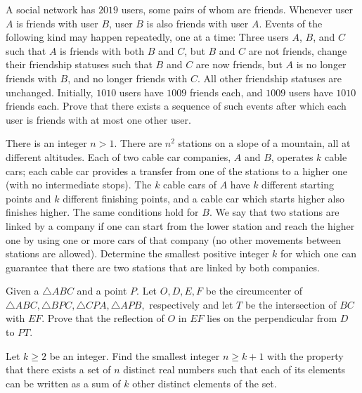 \documentclass[11pt]{scrartcl}
\begin{document}
\begin{problem}[8690567757444826166]
	A social network has $2019$ users, some pairs of whom are friends. Whenever user $A$ is friends with user $B$, user $B$ is also friends with user $A$. Events of the following kind may happen repeatedly, one at a time:
Three users $A$, $B$, and $C$ such that $A$ is friends with both $B$ and $C$, but $B$ and $C$ are not friends, change their friendship statuses such that $B$ and $C$ are now friends, but $A$ is no longer friends with $B$, and no longer friends with $C$. All other friendship statuses are unchanged.
Initially, $1010$ users have $1009$ friends each, and $1009$ users have $1010$ friends each. Prove that there exists a sequence of such events after which each user is friends with at most one other user.

\end{problem}
\begin{problem}[695330092247108707]
There is an integer $n > 1$. There are $n^2$ stations on a slope of a mountain, all at different altitudes. Each of two cable car companies, $A$ and $B$, operates $k$ cable cars; each cable car provides a transfer from one of the stations to a higher one (with no intermediate stops). The $k$ cable cars of $A$ have $k$ different starting points and $k$ different finishing points, and a cable car which starts higher also finishes higher. The same conditions hold for $B$. We say that two stations are linked by a company if one can start from the lower station and reach the higher one by using one or more cars of that company (no other movements between stations are allowed). Determine the smallest positive integer $k$ for which one can guarantee that there are two stations that are linked by both companies.
\end{problem}
\begin{problem}[8569243655022492300]
	Given a $ \triangle ABC $ and a point $ P. $ Let $ O, D, E, F $ be the circumcenter of $ \triangle ABC, \triangle BPC, \triangle CPA, \triangle APB, $ respectively and let $ T $ be the intersection of $ BC $ with $ EF. $ Prove that the reflection of $ O $ in $ EF $ lies on the perpendicular from $ D $ to $ PT. $
\end{problem}
\begin{problem}[1837105952530316058]
Let $k\ge2$ be an integer. Find the smallest integer $n \ge k+1$ with the property that there exists a set of $n$ distinct real numbers such that each of its elements can be written as a sum of $k$ other distinct elements of the set.
\end{problem}
\end{document}
